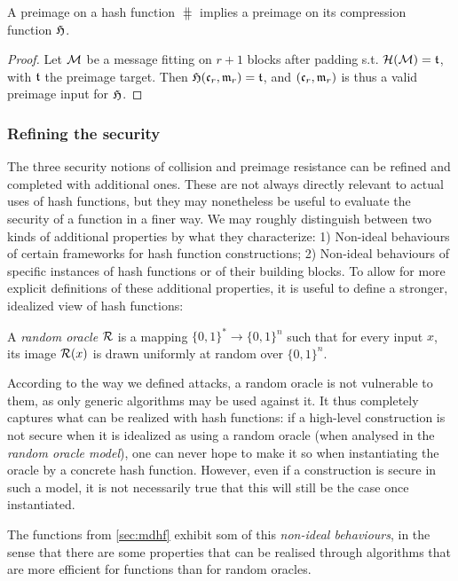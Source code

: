 \begin{prop}
A preimage on a \merkdam hash function $\hash$ implies a preimage on its compression function $\operatorname{\mathfrak{H}}$.
\end{prop}
\begin{proof}
Let $\mathcal{M}$ be a message fitting on $r+1$ blocks after padding s.t. $\operatorname{\mathcal{H}}(\mathcal{M}) = \mathfrak{t}$, with $\mathfrak{t}$ the preimage target.
Then $\operatorname{\mathfrak{H}}(\mathfrak{c}_r, \mathfrak{m}_r) = \mathfrak{t}$, and $(\mathfrak{c}_r, \mathfrak{m}_r)$ is thus a valid preimage input for $\operatorname{\mathfrak{H}}$.
\end{proof}

\subsubsection{Refining the security}
\label{sec:refining_md}

The three security notions of collision and preimage resistance can be refined and completed with additional ones. These are not always directly relevant to actual uses of hash functions, but they may nonetheless be useful to evaluate the security
of a function in a finer way. We may roughly distinguish between two kinds of additional properties by what they characterize: 1) Non-ideal behaviours of certain frameworks for hash function constructions; 2) Non-ideal
behaviours of specific instances of hash functions or of their building blocks.
To allow for more explicit definitions of these additional properties, it is useful to define a stronger, idealized view of hash functions:

\begin{defi}
A \emph{random oracle} $\operatorname{\mathcal{R}}$ is a mapping $\{0,1\}^* \rightarrow \{0,1\}^n$ such that for every input $x$, its image $\operatorname{\mathcal{R}}(x)$ is drawn uniformly at random over $\{0,1\}^n$.
\end{defi}

According to the way we defined attacks, a random oracle is not vulnerable to them, as only generic algorithms may be used against it. It thus completely captures what
can be realized with hash functions: if a high-level construction is not secure when it is idealized as using a random oracle (when analysed in the \emph{random oracle model}),
one can never hope to make it so when instantiating the oracle by a concrete hash function. However, even if a construction is secure in such a model, it is not necessarily true that
this will still be the case once instantiated.

The \merkdam functions from \autoref{sec:mdhf} exhibit som of this \emph{non-ideal behaviours},
in the sense that there are some properties that can be realised through algorithms that are more efficient for \merkdam functions than for random oracles.

